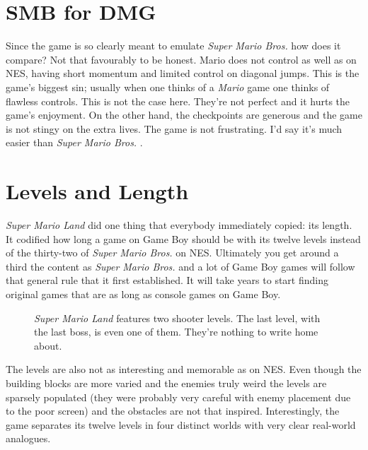 \documentclass{book}
\begin{document}
\FloatBarrier\section*{SMB for DMG}
Since the game is so clearly meant to emulate \emph{Super Mario Bros.} how does it compare? Not that favourably to be honest. Mario does not control as well as on NES, having short momentum and limited control on diagonal jumps. This is the game’s biggest sin; usually when one thinks of a \emph{Mario} game one thinks of flawless controls. This is not the case here. They’re not perfect and it hurts the game’s enjoyment. On the other hand, the checkpoints are generous and the game is not stingy on the extra lives. The game is not frustrating. I’d say it’s much easier than \emph{Super Mario Bros.} .\par
\FloatBarrier\section*{Levels and Length}
\emph{Super Mario Land} did one thing that everybody immediately copied: its length. It codified how long a game on Game Boy should be with its twelve levels instead of the thirty-two of \emph{Super Mario Bros.} on NES. Ultimately you get around a third the content as \emph{Super Mario Bros.} and a lot of Game Boy games will follow that general rule that it first established. It will take years to start finding original games that are as long as console games on Game Boy.\par
\FloatBarrier\vspace{\baselineskip}\begin{figure}[H]\caption*{\emph{Super Mario Land} features two shooter levels. The last level, with the last boss, is even one of them. They’re nothing to write home about.}\end{figure}
The levels are also not as interesting and memorable as on NES. Even though the building blocks are more varied and the enemies truly weird the levels are sparsely populated (they were probably very careful with enemy placement due to the poor screen) and the obstacles are not that inspired. Interestingly, the game separates its twelve levels in four distinct worlds with very clear real-world analogues.\par
\FloatBarrier\vspace{\baselineskip}\centering
\begin{minipage}{0.45\linewidth}\captionsetup{labelformat=empty}\end{minipage}\vspace{2pt}
\end{document}

